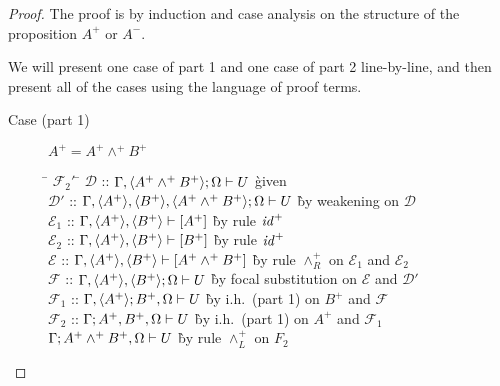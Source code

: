 \documentclass[acmtocl]{robtrans}\pdfoutput=1
\newcommand{\susp}[1]{\langle{#1}\rangle}
\newcommand{\rfoc}[2]{{#1} \vdash [{#2}] \mathstrut}
\newcommand{\ifoc}[3]{{#1}; {#2} \vdash {#3} \mathstrut}
\begin{document}
\begin{proof}
The proof is by induction and case analysis on the structure of the
proposition $A^+$ or $A^-$.  

We will present one case of part 1 and
one case of part 2 line-by-line, and then present all of the cases
using the language of proof terms.


\begin{description}
\item[Case (part 1)] $A^+ = A^+ \wedge^+ B^+$
\begin{tabbing}
\qquad \= $\mathcal F_2'$ \= \kill
\>
$\mathcal D$ \> :: $\ifoc{\Gamma, \susp{A^+ \wedge^+ B^+}}{\Omega}{U}$
  \` given \\
\>
$\mathcal D'$ \> :: $\ifoc{\Gamma, \susp{A^+}, \susp{B^+}, \susp{A^+ \wedge^+ B^+}}{\Omega}{U}$
  \` by weakening on $\mathcal D$\\
\>
$\mathcal E_1$ \> :: $\rfoc{\Gamma, \susp{A^+}, \susp{B^+}}{A^+}$
  \` by rule ${\it id}^+$\\
\>
$\mathcal E_2$ \> :: $\rfoc{\Gamma, \susp{A^+}, \susp{B^+}}{B^+}$
  \` by rule ${\it id}^+$\\
\>
$\mathcal E$ \> :: $\rfoc{\Gamma, \susp{A^+}, \susp{B^+}}{A^+ \wedge^+ B^+}$
  \` by rule $\wedge^+_R$ on $\mathcal E_1$ and $\mathcal E_2$\\
\>
$\mathcal F$ \> :: $\ifoc{\Gamma, \susp{A^+}, \susp{B^+}}{\Omega}{U}$
  \` by focal substitution on $\mathcal E$ and $\mathcal D'$\\
\>
$\mathcal F_1$ \> :: $\ifoc{\Gamma, \susp{A^+}}{B^+, \Omega}{U}$
  \` by i.h.~(part 1) on $B^+$ and $\mathcal F$\\
\>
$\mathcal F_2$ \> :: $\ifoc{\Gamma}{A^+, B^+, \Omega}{U}$
  \` by i.h.~(part 1) on $A^+$ and $\mathcal F_1$\\
\>
$\ifoc{\Gamma}{A^+ \wedge^+ B^+, \Omega}{U}$
  \` by rule $\wedge^+_L$ on $F_2$
\end{tabbing}


\end{description}
\end{proof}
\end{document}
